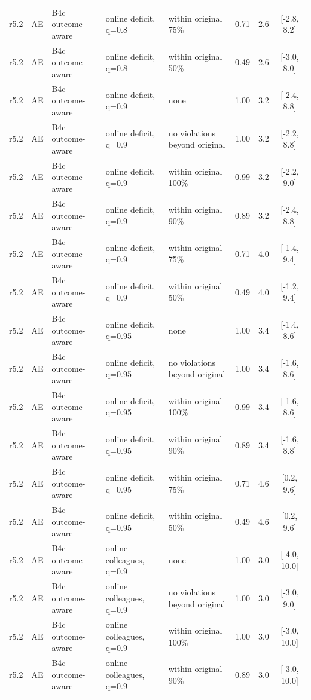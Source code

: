 \documentclass[10pt,onecolumn,letterpaper]{article}
\begin{document}
\begin{longtable}{lllp{4.2cm}p{3.4cm}ccc}
r5.2 & AE & B4c outcome-aware & online deficit, q=0.8 & within original 75\% & 0.71 & 2.6 & [-2.8, 8.2] \\
r5.2 & AE & B4c outcome-aware & online deficit, q=0.8 & within original 50\% & 0.49 & 2.6 & [-3.0, 8.0] \\
r5.2 & AE & B4c outcome-aware & online deficit, q=0.9 & none & 1.00 & 3.2 & [-2.4, 8.8] \\
r5.2 & AE & B4c outcome-aware & online deficit, q=0.9 & no violations beyond original & 1.00 & 3.2 & [-2.2, 8.8] \\
r5.2 & AE & B4c outcome-aware & online deficit, q=0.9 & within original 100\% & 0.99 & 3.2 & [-2.2, 9.0] \\
r5.2 & AE & B4c outcome-aware & online deficit, q=0.9 & within original 90\% & 0.89 & 3.2 & [-2.4, 8.8] \\
r5.2 & AE & B4c outcome-aware & online deficit, q=0.9 & within original 75\% & 0.71 & 4.0 & [-1.4, 9.4] \\
r5.2 & AE & B4c outcome-aware & online deficit, q=0.9 & within original 50\% & 0.49 & 4.0 & [-1.2, 9.4] \\
r5.2 & AE & B4c outcome-aware & online deficit, q=0.95 & none & 1.00 & 3.4 & [-1.4, 8.6] \\
r5.2 & AE & B4c outcome-aware & online deficit, q=0.95 & no violations beyond original & 1.00 & 3.4 & [-1.6, 8.6] \\
r5.2 & AE & B4c outcome-aware & online deficit, q=0.95 & within original 100\% & 0.99 & 3.4 & [-1.6, 8.6] \\
r5.2 & AE & B4c outcome-aware & online deficit, q=0.95 & within original 90\% & 0.89 & 3.4 & [-1.6, 8.8] \\
r5.2 & AE & B4c outcome-aware & online deficit, q=0.95 & within original 75\% & 0.71 & 4.6 & [0.2, 9.6] \\
r5.2 & AE & B4c outcome-aware & online deficit, q=0.95 & within original 50\% & 0.49 & 4.6 & [0.2, 9.6] \\
r5.2 & AE & B4c outcome-aware & online colleagues, q=0.9 & none & 1.00 & 3.0 & [-4.0, 10.0] \\
r5.2 & AE & B4c outcome-aware & online colleagues, q=0.9 & no violations beyond original & 1.00 & 3.0 & [-3.0, 9.0] \\
r5.2 & AE & B4c outcome-aware & online colleagues, q=0.9 & within original 100\% & 1.00 & 3.0 & [-3.0, 10.0] \\
r5.2 & AE & B4c outcome-aware & online colleagues, q=0.9 & within original 90\% & 0.89 & 3.0 & [-3.0, 10.0] \\

\end{longtable}
\end{document}
